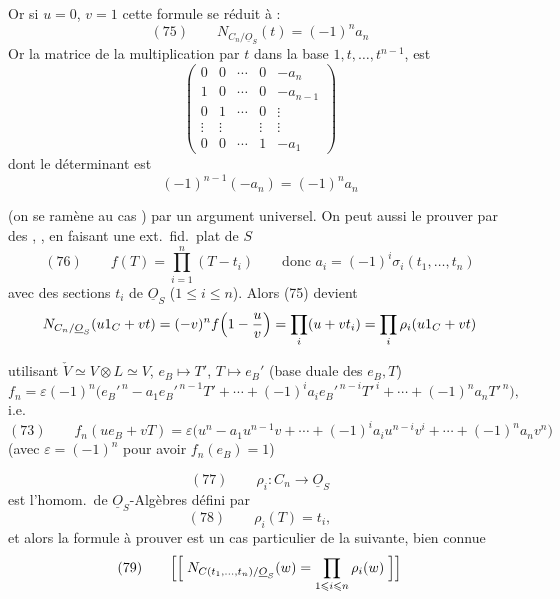 \documentclass[11pt,a4paper]{article}
\begin{document}
Or si $u = 0$, $v = 1$ cette formule se réduit à :
\[
(75)\qquad N_{C_n/\underline{O}_S}(t) = (-1)^n a_n
\]
Or la matrice de la multiplication par $t$ dans la base $1, t, \ldots, t^{n-1}$, est
\[
\begin{pmatrix}
0 & 0 & \cdots & 0 & -a_n \\
1 & 0 & \cdots & 0 & -a_{n-1} \\
0 & 1 & \cdots & 0 & \vdots \\
\vdots & \vdots & & \vdots & \vdots \\
0 & 0 & \cdots & 1 & -a_1
\end{pmatrix}
\]
dont le déterminant est
\[
(-1)^{n-1}(-a_n) = (-1)^n a_n
\]

(on se ramène au cas \ill{} )
\struck{\ill{}} par un argument universel. On peut aussi le prouver par des
, \ill{} , en faisant une ext.\ fid.\ plat
de $S$ \ill{}
\[
(76)\qquad f(T) = \prod_{i=1}^{n} (T - t_i)
\qquad \text{donc } a_i = (-1)^i \sigma_i(t_1, \ldots, t_n)
\]
avec des sections $t_i$ de $\underline{O}_S$ ($1 \leqslant i \leqslant n$).
\struck{\ill{}} Alors (75) devient
\[
N_{C_n/\underline{O}_S}(u 1_C + v t) = (-v)^n f\Bigl(1 - \frac{u}{v}\Bigr)
= \prod_i (u + v t_i)
= \prod_i \rho_i(u 1_C + v t)
\]


utilisant $\check{V} \simeq V \otimes L \simeq V$, \quad $e_B \mapsto T'$,
$T \mapsto e_B'$ (base duale des $e_B, T$)
\[
f_n = \varepsilon (-1)^n \bigl( e_B'^{\,n} - a_1 e_B'^{\,n-1} T' + \cdots
+ (-1)^i a_i e_B'^{\,n-i} T'^{\,i} + \cdots + (-1)^n a_n T'^{\,n} \bigr),
\]
i.e.
\[
(73)\qquad f_n(u e_B + v T) = \varepsilon \bigl( u^n - a_1 u^{n-1} v + \cdots
+ (-1)^i a_i u^{n-i} v^i + \cdots + (-1)^n a_n v^n \bigr)
\]
(avec $\varepsilon = (-1)^n$ pour avoir $f_n(e_B) = 1$)

\[
(77)\qquad \rho_i : C_n \longrightarrow \underline{O}_S
\]
est l'homom.\ de $\underline{O}_S$-Algèbres défini par
\[
(78)\qquad \rho_i(T) = t_i ,
\]
et alors la formule à prouver est un cas particulier de la suivante, bien connue
\[
(79)\qquad \Bigl[\Bigl[\; N_{C(t_1, \ldots, t_n)/\underline{O}_S}(w)
= \prod_{1 \leqslant i \leqslant n} \rho_i(w) \;\Bigr]\Bigr]
\]
\end{document}
